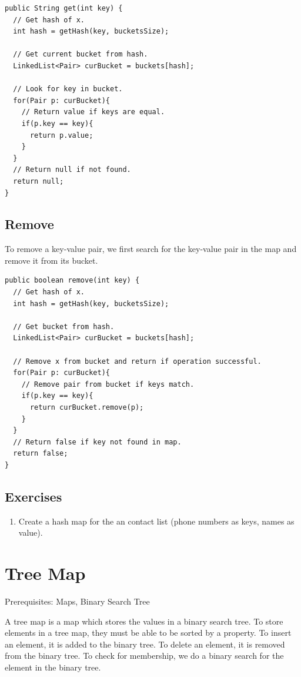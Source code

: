 \documentclass[11pt,oneside]{book}
\begin{document}
\begin{lstlisting}
public String get(int key) {
  // Get hash of x.
  int hash = getHash(key, bucketsSize);
  
  // Get current bucket from hash.
  LinkedList<Pair> curBucket = buckets[hash];
  
  // Look for key in bucket.
  for(Pair p: curBucket){
    // Return value if keys are equal.
    if(p.key == key){
      return p.value;
    }
  }
  // Return null if not found.
  return null;
}
\end{lstlisting}

\subsection{Remove}

To remove a key-value pair, we first search for the key-value pair in the map and remove it from its bucket.

\begin{lstlisting}
public boolean remove(int key) {
  // Get hash of x.
  int hash = getHash(key, bucketsSize);
  
  // Get bucket from hash.
  LinkedList<Pair> curBucket = buckets[hash];
  
  // Remove x from bucket and return if operation successful.
  for(Pair p: curBucket){
    // Remove pair from bucket if keys match.
    if(p.key == key){
      return curBucket.remove(p);
    }
  }
  // Return false if key not found in map.
  return false;
}
\end{lstlisting}

\subsection{Exercises}

\begin{enumerate}
\item Create a hash map for the an contact list (phone numbers as keys, names as value).
\end{enumerate}

        \section{ Tree Map }
        

Prerequisites: Maps, Binary Search Tree

A tree map is a map which stores the values in a binary search tree. To store elements in a tree map, they must be able to be sorted by a property. To insert an element, it is added to the binary tree. To delete an element, it is removed from the binary tree. To check for membership, we do a binary search for the element in the binary tree.
\end{document}
